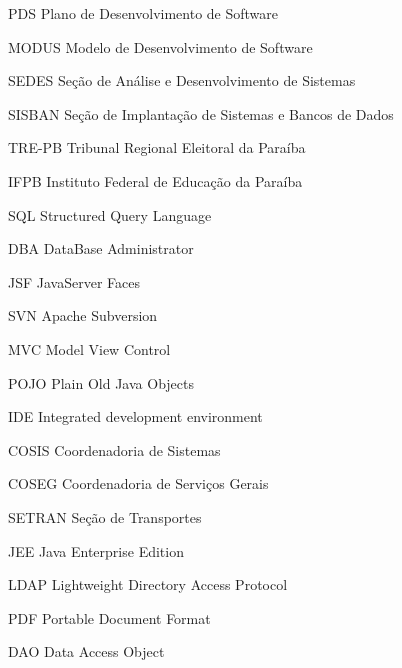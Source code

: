 
\begin{siglas}
    \item[PDS] Plano de Desenvolvimento de Software
    \item[MODUS] Modelo de Desenvolvimento de Software
    \item[SEDES] Seção de Análise e Desenvolvimento de Sistemas
    \item[SISBAN]Seção de Implantação de Sistemas e Bancos de Dados
    \item[TRE-PB] Tribunal Regional Eleitoral da Paraíba
    \item[IFPB] Instituto Federal de Educação da Paraíba
    \item[SQL] Structured Query Language
    \item[DBA] DataBase Administrator
    \item[JSF] JavaServer Faces
    \item[SVN] Apache Subversion
    \item[MVC] Model View Control
    \item[POJO] Plain Old Java Objects
    \item[IDE] Integrated development environment
    \item[COSIS] Coordenadoria de Sistemas
    \item[COSEG] Coordenadoria de Serviços Gerais
    \item[SETRAN] Seção de Transportes
    \item[JEE] Java Enterprise Edition
    \item[LDAP] Lightweight Directory Access Protocol
    \item[PDF] Portable Document Format
    \item[DAO] Data Access Object 
\end{siglas}

